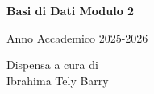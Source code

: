 \begin{titlepage}
    \vspace*{\fill}
    \centering
    {\LARGE \textbf{Basi di Dati  Modulo 2}\par}
    \vspace{1cm}
    {\Large Anno Accademico 2025-2026\par}
    \vspace{1cm}
    {\normalsize Dispensa a cura di\\[2mm] Ibrahima Tely Barry \par}
    \vspace*{\fill}
\end{titlepage}
\newpage
